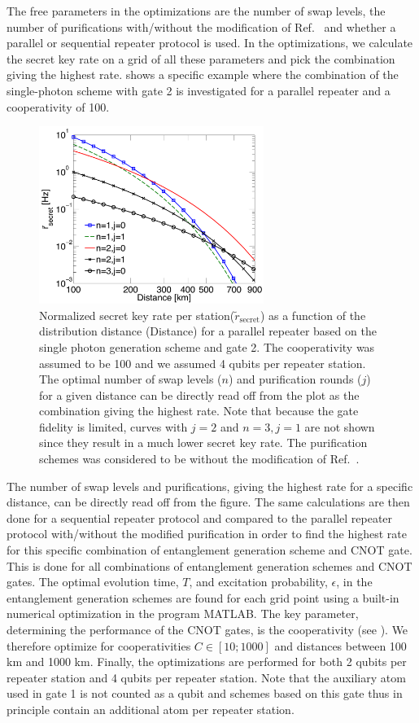 The free parameters in the optimizations are the number of swap levels, the
number of purifications with/without the modification of Ref.~\cite{nickerson}
and whether a parallel or sequential repeater protocol is used. In the
optimizations, we calculate the secret key rate on a grid of all these
parameters and pick the combination giving the highest rate.
 shows a specific example where the combination of the
single-photon scheme with gate 2 is investigated for a parallel repeater and a
cooperativity of 100.
\begin{figure} 
\centering
\includegraphics[width=0.65\textwidth]{./figs_Borregaard_PRA2015/figureX6}
\caption[Example of repeater architecture]{Normalized secret key rate per
station($\tilde{r}_{\text{secret}}$) as a function of the distribution distance
(Distance) for a parallel repeater based on the single photon generation scheme
and gate 2. The cooperativity was assumed to be 100 and we assumed 4 qubits per
repeater station. The optimal number of swap levels ($n$) and purification
rounds ($j$) for a given distance can be directly read off from the plot as the
combination giving the highest rate. Note that because the gate fidelity is
limited, curves with $j=2$ and $n=3,j=1$ are not shown since they result in a
much lower secret key rate. The purification schemes was considered to be
without the modification of Ref.~\cite{nickerson}.}
\label{fig:figureX6}
\end{figure} 
The number of swap levels and purifications, giving the highest rate for a
specific distance, can be directly read off from the figure. The same
calculations are then done for a sequential repeater protocol and compared to
the parallel repeater protocol with/without the modified purification in order
to find the highest rate for this specific combination of entanglement
generation scheme and CNOT gate. This is done for all combinations of
entanglement generation schemes and CNOT gates. The optimal evolution time, $T$,
and excitation probability, $\epsilon$, in the entanglement generation schemes
are found for each grid point using a built-in numerical optimization in the
program MATLAB.
The key parameter, determining the performance of the CNOT gates, is the
cooperativity (see ). We therefore optimize for
cooperativities $C\in[10;1000]$ and distances between 100 km and 1000 km.
Finally, the optimizations are performed for both 2 qubits per repeater station
and 4 qubits per repeater station. Note that the auxiliary atom used in gate 1
is not counted as a qubit and schemes based on this gate thus in principle
contain an additional atom per repeater station.

